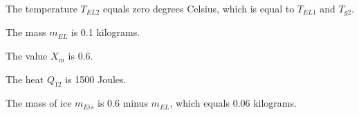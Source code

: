 The temperature \( T_{EL2} \) equals zero degrees Celsius, which is equal to \( T_{EL1} \) and \( T_{g2} \).

The mass \( m_{EL} \) is 0.1 kilograms.

The value \( X_m \) is 0.6.

The heat \( Q_{12} \) is 1500 Joules.

The mass of ice \( m_{Eis} \) is 0.6 minus \( m_{EL} \), which equals 0.06 kilograms.